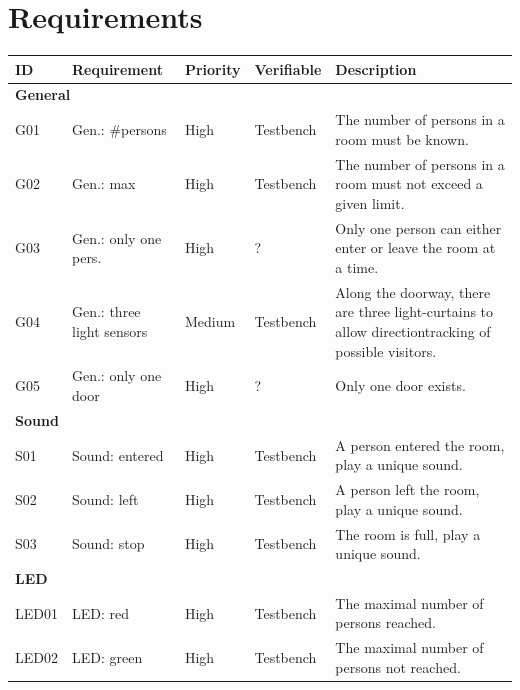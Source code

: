 \documentclass[12pt,a4 paper] {report}
\begin{document}
\chapter{Requirements}
\begin{center}
	\begin{tabular}{|p{1.5cm}|p{3.5cm}|p{1.5cm}|p{2cm}|p{5.5cm}|}
		\hline
		\textbf{ID} & \textbf{Requirement} & \textbf{Priority} & \textbf{Verifiable} & \textbf{Description} \\
		\hline
		\multicolumn{5}{|l|}{\textbf{General}} \\
		\hline
		G01 & Gen.: \#persons &  High &  Testbench & The number of persons in a room must be known. \\
		\hline
		G02 & Gen.: max & High &  Testbench & The number of persons in a room must not exceed a given limit. \\
		\hline
		G03 & Gen.: only one pers. & High & ? & Only one person can either enter or leave the room at a time. \\
		\hline
		G04 & Gen.: three light sensors & Medium & Testbench & Along the doorway, there are three light-curtains to allow directiontracking of possible visitors. \\
		\hline
		G05 & Gen.: only one door & High & ? & Only one door exists. \\
		\hline
		\multicolumn{5}{|l|}{\textbf{Sound}} \\
		\hline
		S01 & Sound: entered & High & Testbench & A person entered the room, play a unique sound. \\
		\hline
		S02 & Sound: left & High & Testbench & A person left the room, play a unique sound. \\
		\hline
		S03 & Sound: stop & High & Testbench & The room is full, play a unique sound. \\
		\hline
		\multicolumn{5}{|l|}{\textbf{LED}} \\
		\hline
		LED01 & LED: red &  High & Testbench & The maximal number of persons reached. \\
		\hline
		LED02 & LED: green & High & Testbench & The maximal number of persons not reached. \\
		\hline
	\end{tabular}
\end{center}
\end{document}
